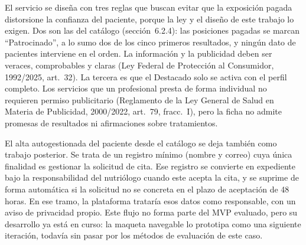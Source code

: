 \documentclass[12pt, a4paper]{article}
\begin{document}
El servicio se diseña con tres reglas que buscan evitar que la
exposición pagada distorsione la confianza del paciente, porque la ley y
el diseño de este trabajo lo exigen. Dos son las del catálogo (sección~6.2.4): las posiciones
pagadas se marcan ``Patrocinado'', a lo sumo dos de los cinco primeros
resultados, y ningún dato de pacientes interviene en el orden. La información y la publicidad deben ser veraces,
comprobables y claras (Ley Federal de Protección al Consumidor,
1992/2025, art.~32). La tercera es que el Destacado solo se activa con
el perfil completo. Los servicios que un profesional presta de forma individual no
requieren permiso publicitario (Reglamento de la Ley General de Salud en
Materia de Publicidad, 2000/2022, art.~79, fracc.~I), pero la ficha no
admite promesas de resultados ni afirmaciones sobre tratamientos.

El alta autogestionada del paciente desde el catálogo se deja también
como trabajo posterior. Se trata de un registro mínimo (nombre y correo)
cuya única finalidad es gestionar la solicitud de cita. Ese registro se
convierte en expediente bajo la responsabilidad del nutriólogo cuando
este acepta la cita, y se suprime de forma automática si la solicitud no
se concreta en el plazo de aceptación de 48 horas. En ese tramo, la
plataforma trataría esos datos como responsable, con un aviso de
privacidad propio. Este flujo no forma parte del MVP evaluado, pero su
desarrollo ya está en curso: la maqueta navegable lo prototipa como una
siguiente iteración, todavía sin pasar por los métodos de evaluación de
este caso.
\end{document}
